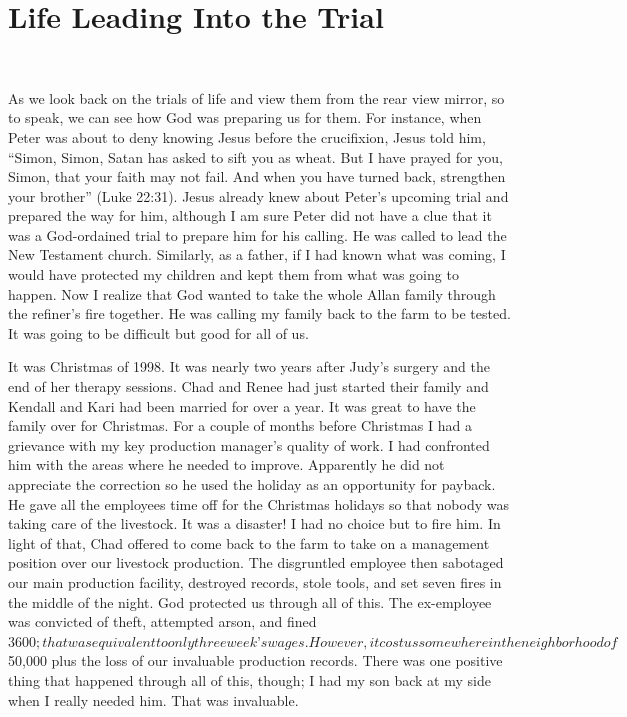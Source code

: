 \documentclass[oneside]{book}
\begin{document}
\section{Life Leading Into the Trial}
\

As we look back on the trials of life and view them from the rear view mirror, so to speak, we can see how God was preparing us for them. For instance, when Peter was about to deny knowing Jesus before the crucifixion, Jesus told him, “Simon, Simon, Satan has asked to sift you as wheat. But I have prayed for you, Simon, that your faith may not fail. And when you have turned back, strengthen your brother” (Luke 22:31). Jesus already knew about Peter’s upcoming trial and  prepared the way for him, although I am sure Peter did not have a clue that it was a God-ordained trial to prepare him for his calling. He was called to lead the New Testament church. Similarly, as a father, if I had known what was coming, I would have protected my children and kept them from what was going to happen. Now I realize that God wanted to take the whole Allan family through the refiner’s fire together. He was calling my family back to the farm to be tested. It was going to be difficult but good for all of us. 

It was Christmas of 1998. It was nearly two years after Judy's surgery and the end of her therapy sessions. Chad and Renee had just started their family and Kendall and Kari had been married for over a year. It was great to have the family over for Christmas. For a couple of months before Christmas I had a grievance with my key production manager’s quality of work. I had confronted him with the areas where he needed to improve. Apparently he did not appreciate the correction so he used the holiday as an opportunity for payback. He gave all the employees time off for the Christmas holidays so that nobody was taking care of the livestock. It was a disaster! I had no choice but to fire him. In light of that, Chad offered to come back to the farm to take on a management position over our livestock production. The disgruntled employee then sabotaged our main production facility, destroyed records, stole tools, and set seven fires in the middle of the night. God protected us through all of this. The ex-employee was convicted of theft, attempted arson, and fined $3600; that was equivalent to only three week’s wages. However, it cost us somewhere in the neighborhood of $50,000 plus the loss of our invaluable production records. There was one positive thing that happened through all of this, though; I had my son back at my side when I really needed him. That was invaluable.
\end{document}
